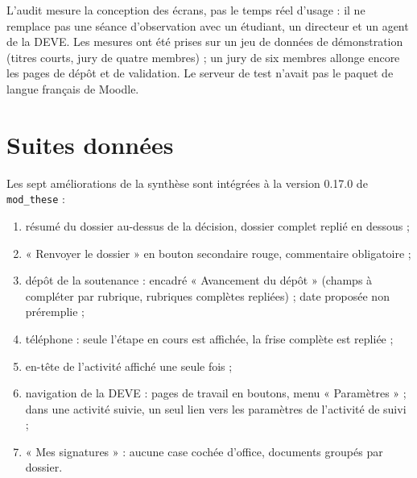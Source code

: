 \documentclass[11pt,a4paper]{article}
\newcommand{\code}[1]{\texttt{#1}}
\begin{document}
L'audit mesure la conception des écrans, pas le temps réel d'usage : il ne remplace pas une
séance d'observation avec un étudiant, un directeur et un agent de la DEVE. Les mesures ont été
prises sur un jeu de données de démonstration (titres courts, jury de quatre membres) ; un jury
de six membres allonge encore les pages de dépôt et de validation. Le serveur de test n'avait
pas le paquet de langue français de Moodle.

\section{Suites données}

Les sept améliorations de la synthèse sont intégrées à la version 0.17.0 de \code{mod\_these} :

\begin{enumerate}
  \item résumé du dossier au-dessus de la décision, dossier complet replié en dessous ;
  \item « Renvoyer le dossier » en bouton secondaire rouge, commentaire obligatoire ;
  \item dépôt de la soutenance : encadré « Avancement du dépôt » (champs à compléter par rubrique,
    rubriques complètes repliées) ; date proposée non préremplie ;
  \item téléphone : seule l'étape en cours est affichée, la frise complète est repliée ;
  \item en-tête de l'activité affiché une seule fois ;
  \item navigation de la DEVE : pages de travail en boutons, menu « Paramètres » ; dans une
    activité suivie, un seul lien vers les paramètres de l'activité de suivi ;
  \item « Mes signatures » : aucune case cochée d'office, documents groupés par dossier.
\end{enumerate}
\end{document}
